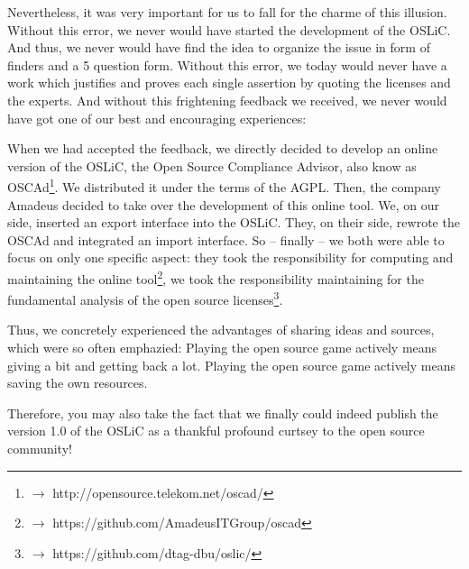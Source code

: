 Nevertheless, it was very important for us to fall for the charme of this
illusion. Without this error, we never would have started the development of the
OSLiC. And thus, we never would have find the idea to organize the issue in form
of finders and a 5 question form. Without this error, we today would never have
a work which justifies and proves each single assertion by quoting the licenses
and the experts. And without this frightening feedback we received, we never
would have got one of our best and encouraging experiences: 

When we had accepted the feedback, we directly decided to develop an online
version of the OSLiC, the Open Source Compliance Advisor, also know as
OSCAd\footnote{$\rightarrow$ http://opensource.telekom.net/oscad/}.
We distributed it under the terms of the AGPL. Then, the company Amadeus decided
to take over the development of this online tool. We, on our side, inserted an
export interface into the OSLiC. They, on their side, rewrote the OSCAd and
integrated an import interface. So -- finally -- we both were able to focus on
only one specific aspect:  they took the responsibility for computing and
maintaining the online tool\footnote{$\rightarrow$
https://github.com/AmadeusITGroup/oscad}, we took the responsibility maintaining
for the fundamental analysis of the open source licenses\footnote{$\rightarrow$
https://github.com/dtag-dbu/oslic/}.

Thus, we concretely experienced the advantages of sharing ideas and sources,
which were so often emphazied: Playing the open source game actively means
giving a bit and getting back a lot. Playing the open source game actively means
saving the own resources.
 
Therefore, you may also take the fact that we finally could indeed publish the
version 1.0 of the OSLiC as a thankful profound curtsey to the open source
community!
